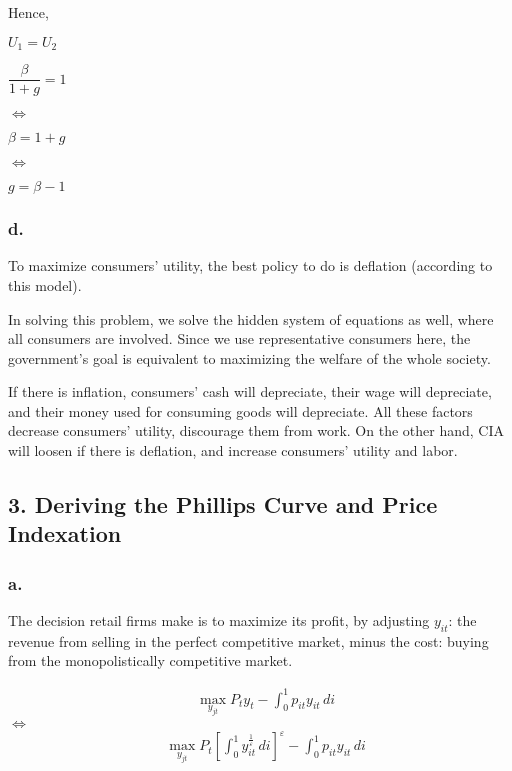 \documentclass{article}
\begin{document}
Hence,

$U_{1}=U_{2}$

$\dfrac{\beta}{1+g}=1$

$\iff$

$\beta=1+g$

$\iff$

$\boxed{g=\beta-1}$

\subsubsection*{d.}

To maximize consumers' utility, the best policy to do is deflation (according to this model).

In solving this problem, we solve the hidden system of equations as well, where all consumers are involved. Since we use representative consumers here, the government's goal is equivalent to maximizing the welfare of the whole society. 

If there is inflation, consumers' cash will depreciate, their wage will depreciate, and their money used for consuming goods will depreciate. All these factors decrease consumers' utility, discourage them from work. On the other hand, CIA will loosen if there is deflation, and increase consumers' utility and labor.

\subsection*{3. Deriving the Phillips Curve and Price Indexation}

\subsubsection*{a.}

The decision retail firms make is to maximize its profit, by adjusting $y_{it}$: the revenue from selling in the perfect competitive market, minus the cost: buying from the monopolistically competitive market.

\begin{equation*}
    \begin{aligned}
    & \max_{y_{jt}}P_{t}y_{t}-\int_{0}^{1} p_{it}y_{it} \,di 
    \end{aligned}
\end{equation*}
$\iff$
\begin{equation*}
    \begin{aligned}
    & \max_{y_{jt}}P_{t}\left[\int_{0}^{1} y^{\frac{1}{\varepsilon}}_{it} \,di \right]^{\varepsilon}-\int_{0}^{1} p_{it}y_{it} \,di 
    \end{aligned}
\end{equation*}
\end{document}
